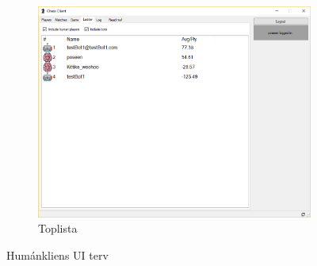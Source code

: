 \documentclass[twoside, a4paper, 12pt]{article}
\begin{document}
\begin{figure}
\begin{subfigure}[b]{0.475\textwidth}
	\includegraphics[width=\textwidth]{img/humanClientLadder.png}
	\caption{Toplista}
	\label{fig:humanClientLadder}
	\end{subfigure}

	\caption[ Humánkliens UI terv ]
	{\small Humánkliens UI terv}
	\label{fig:humanClient}
\end{figure}
\end{document}
